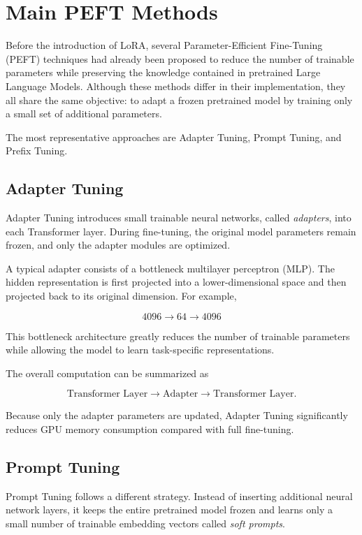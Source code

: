 \section{Main PEFT Methods}

Before the introduction of LoRA, several Parameter-Efficient Fine-Tuning (PEFT) techniques had already been proposed to reduce the number of trainable parameters while preserving the knowledge contained in pretrained Large Language Models. Although these methods differ in their implementation, they all share the same objective: to adapt a frozen pretrained model by training only a small set of additional parameters.

The most representative approaches are Adapter Tuning, Prompt Tuning, and Prefix Tuning.
\subsection*{Adapter Tuning}

Adapter Tuning introduces small trainable neural networks, called \emph{adapters}, into each Transformer layer. During fine-tuning, the original model parameters remain frozen, and only the adapter modules are optimized.

A typical adapter consists of a bottleneck multilayer perceptron (MLP). The hidden representation is first projected into a lower-dimensional space and then projected back to its original dimension. For example,

\[
4096
\longrightarrow
64
\longrightarrow
4096
\]

This bottleneck architecture greatly reduces the number of trainable parameters while allowing the model to learn task-specific representations.

The overall computation can be summarized as

\[
\text{Transformer Layer}
\longrightarrow
\text{Adapter}
\longrightarrow
\text{Transformer Layer}.
\]

Because only the adapter parameters are updated, Adapter Tuning significantly reduces GPU memory consumption compared with full fine-tuning.
\subsection*{Prompt Tuning}

Prompt Tuning follows a different strategy. Instead of inserting additional neural network layers, it keeps the entire pretrained model frozen and learns only a small number of trainable embedding vectors called \emph{soft prompts}.

